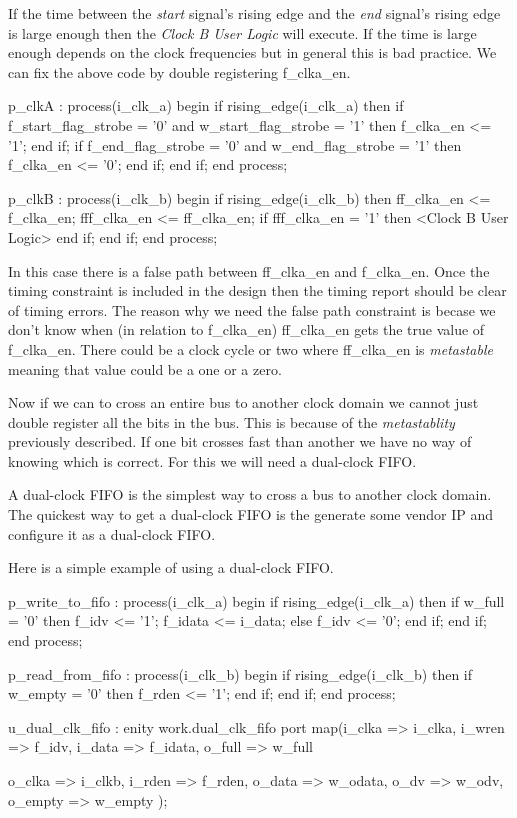 If the time between the \emph{start} signal's rising edge and the \emph{end} signal's rising edge is large enough then the \emph{Clock B User Logic} will execute. If the time is large enough depends on the clock frequencies but in general this is bad practice. We can fix the above code by double registering f\_clka\_en. 

\begin{VHDLlisting}[tabsize=4]
p_clkA : process(i_clk_a)
begin
	if rising_edge(i_clk_a) then
		if f_start_flag_strobe = '0' and w_start_flag_strobe = '1' then
			f_clka_en <= '1';
		end if;
		if f_end_flag_strobe = '0' and w_end_flag_strobe = '1' then
			f_clka_en <= '0';
		end if;
	end if;
end process;

p_clkB : process(i_clk_b)
begin
	if rising_edge(i_clk_b) then
		ff_clka_en <= f_clka_en;
		fff_clka_en <= ff_clka_en;
		if fff_clka_en = '1' then
			<Clock B User Logic>
		end if;
	end if;
end process;
\end{VHDLlisting}	

In this case there is a false path between ff\_clka\_en and f\_clka\_en. Once the timing constraint is included in the design then the timing report should be clear of timing errors. The reason why we need the false path constraint is becase we don't know when (in relation to f\_clka\_en) ff\_clka\_en gets the true value of f\_clka\_en. There could be a clock cycle or two where ff\_clka\_en is \emph{metastable} meaning that value could be a one or a zero. 

Now if we can to cross an entire bus to another clock domain we cannot just double register all the bits in the bus. This is because of the \emph{metastablity} previously described. If one bit crosses fast than another we have no way of knowing which is correct. For this we will need a dual-clock \ac{FIFO}. 

A dual-clock \ac{FIFO} is the simplest way to cross a bus to another clock domain. The quickest way to get a dual-clock \ac{FIFO} is the generate some vendor \ac{IP} and configure it as a dual-clock \ac{FIFO}. 

Here is a simple example of using a dual-clock \ac{FIFO}.

\begin{VHDLlisting}[tabsize=4]
p_write_to_fifo : process(i_clk_a)
begin
	if rising_edge(i_clk_a) then
		if w_full = '0' then
			f_idv <= '1';
			f_idata <= i_data;
		else
			f_idv <= '0';
		end if;
	end if;	
end process;

p_read_from_fifo : process(i_clk_b)
begin	
	if rising_edge(i_clk_b) then
		if w_empty = '0' then
			f_rden <= '1';
		end if;
	end if;
end process;

u_dual_clk_fifo : enity work.dual_clk_fifo
port map(i_clka  => i_clka, 
		 i_wren  => f_idv,
		 i_data  => f_idata,
		 o_full  => w_full
		 
		 o_clka  => i_clkb,
		 i_rden  => f_rden,
		 o_data  => w_odata,
		 o_dv    => w_odv,
		 o_empty => w_empty
);
\end{VHDLlisting}

